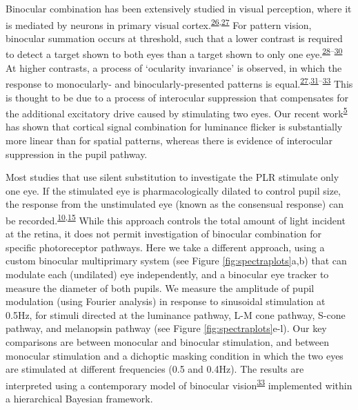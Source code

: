 \documentclass[
]{article}
\begin{document}
Binocular combination has been extensively studied in visual perception, where it is mediated by neurons in primary visual cortex.\textsuperscript{\protect\hyperlink{ref-Hubel1962}{26},\protect\hyperlink{ref-Moradi2009}{27}} For pattern vision, binocular summation occurs at threshold, such that a lower contrast is required to detect a target shown to both eyes than a target shown to only one eye.\textsuperscript{\protect\hyperlink{ref-Baker2018}{28}--\protect\hyperlink{ref-Legge1984}{30}} At higher contrasts, a process of `ocularity invariance' is observed, in which the response to monocularly- and binocularly-presented patterns is equal.\textsuperscript{\protect\hyperlink{ref-Moradi2009}{27},\protect\hyperlink{ref-Baker2007}{31}--\protect\hyperlink{ref-Meese2006}{33}} This is thought to be due to a process of interocular suppression that compensates for the additional excitatory drive caused by stimulating two eyes. Our recent work\textsuperscript{\protect\hyperlink{ref-Segala2023}{5}} has shown that cortical signal combination for luminance flicker is substantially more linear than for spatial patterns, whereas there is evidence of interocular suppression in the pupil pathway.

Most studies that use silent substitution to investigate the PLR stimulate only one eye. If the stimulated eye is pharmacologically dilated to control pupil size, the response from the unstimulated eye (known as the consensual response) can be recorded.\textsuperscript{\protect\hyperlink{ref-Spitschan2014}{10},\protect\hyperlink{ref-McDougal2010}{15}} While this approach controls the total amount of light incident at the retina, it does not permit investigation of binocular combination for specific photoreceptor pathways. Here we take a different approach, using a custom binocular multiprimary system (see Figure \ref{fig:spectraplots}a,b) that can modulate each (undilated) eye independently, and a binocular eye tracker to measure the diameter of both pupils. We measure the amplitude of pupil modulation (using Fourier analysis) in response to sinusoidal stimulation at 0.5Hz, for stimuli directed at the luminance pathway, L-M cone pathway, S-cone pathway, and melanopsin pathway (see Figure \ref{fig:spectraplots}e-l). Our key comparisons are between monocular and binocular stimulation, and between monocular stimulation and a dichoptic masking condition in which the two eyes are stimulated at different frequencies (0.5 and 0.4Hz). The results are interpreted using a contemporary model of binocular vision\textsuperscript{\protect\hyperlink{ref-Meese2006}{33}} implemented within a hierarchical Bayesian framework.
\end{document}
